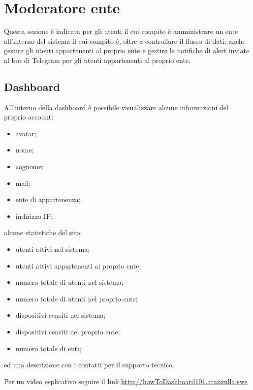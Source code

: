 \section{Moderatore ente}
Questa sezione è indicata per gli utenti il cui compito è amministrare un ente all'interno del sistema il cui compito è, oltre a controllare il flusso di dati, anche gestire gli utenti appartenenti al proprio ente e gestire le notifiche di alert inviate al bot di Telegram per gli utenti appartenenti al proprio ente.


\subsection{Dashboard}
All'interno della dashboard è possibile visualizzare alcune informazioni del proprio account:
\begin{itemize}
	\item avatar;
	\item nome;
	\item cognome;
	\item mail;
	\item ente di appartenenza;
	\item indirizzo IP;
\end{itemize}

alcune statistiche del sito:
\begin{itemize}
	\item utenti attivi nel sistema;
	\item utenti attivi appartenenti al proprio ente;
	\item numero totale di utenti nel sistema;
	\item numero totale di utenti nel proprio ente;
	\item dispositivi censiti nel sistema;
	\item dispositivi censiti nel proprio ente;
	\item numero totale di enti;
\end{itemize}

ed una descrizione con i contatti per il supporto tecnico.

Per un video esplicativo seguire il link \url{http://howToDashboard101.aranzulla.swe}